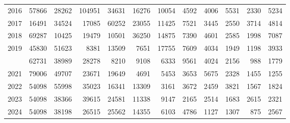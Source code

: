 \documentclass[
]{article}
\begin{document}
\begin{longtable}[t]{lrrrrrrrrrrr}
2016 & 57866 & 28262 & 104951 & 34631 & 16276 & 10054 & 4592 & 4006 & 5531 & 2330 & 5234\\
2017 & 16491 & 34524 & 17085 & 60252 & 23055 & 11425 & 7521 & 3445 & 2550 & 3714 & 4814\\
2018 & 69287 & 10425 & 19479 & 10501 & 36250 & 14875 & 7390 & 4601 & 2585 & 1998 & 7087\\
2019 & 45830 & 51623 & 8381 & 13509 & 7651 & 17755 & 7609 & 4034 & 1949 & 1198 & 3933\\
\addlinespace
2020 & 62731 & 38989 & 28278 & 8210 & 9108 & 6333 & 9561 & 4024 & 2156 & 988 & 1779\\
2021 & 79006 & 49707 & 23671 & 19649 & 4691 & 5453 & 3653 & 5675 & 2328 & 1455 & 1255\\
2022 & 54098 & 55998 & 35023 & 16341 & 13309 & 3161 & 3672 & 2459 & 3821 & 1567 & 1824\\
2023 & 54098 & 38366 & 39615 & 24581 & 11338 & 9147 & 2165 & 2514 & 1683 & 2615 & 2321\\
2024 & 54098 & 38198 & 26515 & 25562 & 14355 & 6103 & 4786 & 1127 & 1307 & 875 & 2567\\*
\end{longtable}
\end{document}
